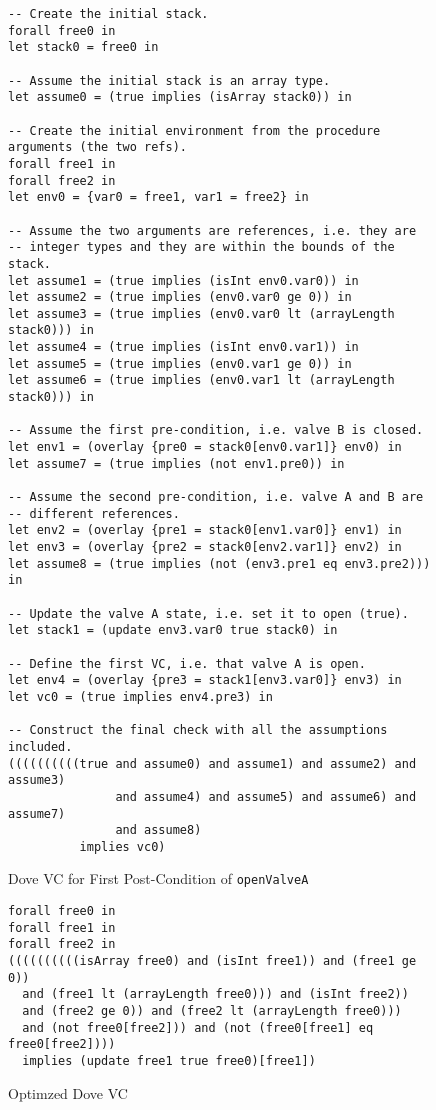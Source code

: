 \documentclass{article}
\begin{document}
\begin{figure}
  \caption{Dove VC for First Post-Condition of \texttt{openValveA}}
  \label{fig:openValveAVC1}
  \begin{lstlisting}
-- Create the initial stack.
forall free0 in
let stack0 = free0 in

-- Assume the initial stack is an array type.
let assume0 = (true implies (isArray stack0)) in

-- Create the initial environment from the procedure arguments (the two refs).
forall free1 in
forall free2 in
let env0 = {var0 = free1, var1 = free2} in

-- Assume the two arguments are references, i.e. they are
-- integer types and they are within the bounds of the stack.
let assume1 = (true implies (isInt env0.var0)) in
let assume2 = (true implies (env0.var0 ge 0)) in
let assume3 = (true implies (env0.var0 lt (arrayLength stack0))) in
let assume4 = (true implies (isInt env0.var1)) in
let assume5 = (true implies (env0.var1 ge 0)) in
let assume6 = (true implies (env0.var1 lt (arrayLength stack0))) in

-- Assume the first pre-condition, i.e. valve B is closed.
let env1 = (overlay {pre0 = stack0[env0.var1]} env0) in
let assume7 = (true implies (not env1.pre0)) in

-- Assume the second pre-condition, i.e. valve A and B are
-- different references.
let env2 = (overlay {pre1 = stack0[env1.var0]} env1) in
let env3 = (overlay {pre2 = stack0[env2.var1]} env2) in
let assume8 = (true implies (not (env3.pre1 eq env3.pre2))) in

-- Update the valve A state, i.e. set it to open (true).
let stack1 = (update env3.var0 true stack0) in

-- Define the first VC, i.e. that valve A is open.
let env4 = (overlay {pre3 = stack1[env3.var0]} env3) in
let vc0 = (true implies env4.pre3) in

-- Construct the final check with all the assumptions included.
((((((((((true and assume0) and assume1) and assume2) and assume3)
               and assume4) and assume5) and assume6) and assume7)
               and assume8)
          implies vc0)
  \end{lstlisting}
\end{figure}

\begin{figure}
  \caption{Optimzed Dove VC}
  \label{fig:openValveAVC1Opt}
  \begin{lstlisting}
forall free0 in
forall free1 in
forall free2 in
((((((((((isArray free0) and (isInt free1)) and (free1 ge 0))
  and (free1 lt (arrayLength free0))) and (isInt free2))
  and (free2 ge 0)) and (free2 lt (arrayLength free0)))
  and (not free0[free2])) and (not (free0[free1] eq free0[free2])))
  implies (update free1 true free0)[free1])
  \end{lstlisting}
\end{figure}
\end{document}
